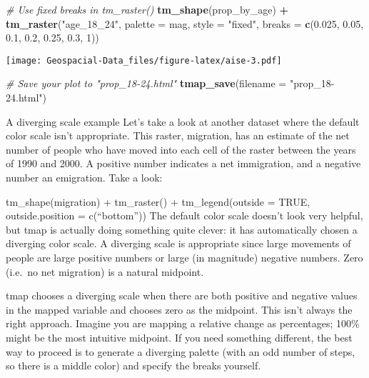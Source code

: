 \documentclass[]{article}
\newenvironment{Shaded}{\begin{snugshade}}{\end{snugshade}}
\newcommand{\CommentTok}[1]{\textcolor[rgb]{0.56,0.35,0.01}{\textit{#1}}}
\newcommand{\DataTypeTok}[1]{\textcolor[rgb]{0.13,0.29,0.53}{#1}}
\newcommand{\DecValTok}[1]{\textcolor[rgb]{0.00,0.00,0.81}{#1}}
\newcommand{\FloatTok}[1]{\textcolor[rgb]{0.00,0.00,0.81}{#1}}
\newcommand{\KeywordTok}[1]{\textcolor[rgb]{0.13,0.29,0.53}{\textbf{#1}}}
\newcommand{\NormalTok}[1]{#1}
\newcommand{\OperatorTok}[1]{\textcolor[rgb]{0.81,0.36,0.00}{\textbf{#1}}}
\newcommand{\StringTok}[1]{\textcolor[rgb]{0.31,0.60,0.02}{#1}}
\begin{document}
\begin{Shaded}
\begin{Highlighting}[]
\CommentTok{# Use fixed breaks in tm_raster()}
\KeywordTok{tm_shape}\NormalTok{(prop_by_age) }\OperatorTok{+}
\StringTok{  }\KeywordTok{tm_raster}\NormalTok{(}\StringTok{"age_18_24"}\NormalTok{, }\DataTypeTok{palette =}\NormalTok{ mag,}
    \DataTypeTok{style =} \StringTok{"fixed"}\NormalTok{, }\DataTypeTok{breaks =} \KeywordTok{c}\NormalTok{(}\FloatTok{0.025}\NormalTok{, }\FloatTok{0.05}\NormalTok{, }\FloatTok{0.1}\NormalTok{, }\FloatTok{0.2}\NormalTok{, }\FloatTok{0.25}\NormalTok{, }\FloatTok{0.3}\NormalTok{, }\DecValTok{1}\NormalTok{))}
\end{Highlighting}
\end{Shaded}

\texttt{[image: Geospacial-Data\_files/figure-latex/aise-3.pdf]}

\begin{Shaded}
\begin{Highlighting}[]
\CommentTok{# Save your plot to "prop_18-24.html"}
\KeywordTok{tmap_save}\NormalTok{(}\DataTypeTok{filename =} \StringTok{"prop_18-24.html"}\NormalTok{)}
\end{Highlighting}
\end{Shaded}

A diverging scale example Let's take a look at another dataset where the
default color scale isn't appropriate. This raster, migration, has an
estimate of the net number of people who have moved into each cell of
the raster between the years of 1990 and 2000. A positive number
indicates a net immigration, and a negative number an emigration. Take a
look:

tm\_shape(migration) + tm\_raster() + tm\_legend(outside = TRUE,
outside.position = c(``bottom'')) The default color scale doesn't look
very helpful, but tmap is actually doing something quite clever: it has
automatically chosen a diverging color scale. A diverging scale is
appropriate since large movements of people are large positive numbers
or large (in magnitude) negative numbers. Zero (i.e.~no net migration)
is a natural midpoint.

tmap chooses a diverging scale when there are both positive and negative
values in the mapped variable and chooses zero as the midpoint. This
isn't always the right approach. Imagine you are mapping a relative
change as percentages; 100\% might be the most intuitive midpoint. If
you need something different, the best way to proceed is to generate a
diverging palette (with an odd number of steps, so there is a middle
color) and specify the breaks yourself.
\end{document}
